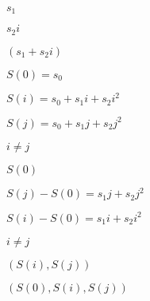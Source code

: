 \documentclass[10pt]{book}
\begin{document}
\begin{mdSnippets}
\begin{mdInlineSnippet}[54dbe5ef61d2f9977c7be03737833609]%
$s_1$\end{mdInlineSnippet}%
\begin{mdInlineSnippet}[ca54723822a18ec052b551ba324cf8a3]%
$s_2i$\end{mdInlineSnippet}%
\begin{mdInlineSnippet}[a60d0a14418f167dfeb76f507c982ff4]%
$(s_1 + s_2 i)$\end{mdInlineSnippet}%
\begin{mdInlineSnippet}[a9175ac52b5153759f2c3680d6dde71d]%
$S(0) = s_0$\end{mdInlineSnippet}%
\begin{mdInlineSnippet}[796480b982a47ec1631c9349ea57f9d9]%
$S(i) = s_0 + s_1 i  + s_2i^2$\end{mdInlineSnippet}%
\begin{mdInlineSnippet}%
$S(j) = s_0 +s_1 j + s_2j^2$\end{mdInlineSnippet}%
\begin{mdInlineSnippet}%
$i \neq j$\end{mdInlineSnippet}%
\begin{mdInlineSnippet}%
$S(0)$\end{mdInlineSnippet}%
\begin{mdInlineSnippet}[4988749526f61dd0008521d8579fbde5]%
$S(j) - S(0) = s_1j + s_2j^2$\end{mdInlineSnippet}%
\begin{mdInlineSnippet}[50776e1692168ef3fc619beb70f44d9e]%
$S(i) - S(0) = s_1i + s_2i^2$\end{mdInlineSnippet}%
\begin{mdInlineSnippet}%
$i \neq j$\end{mdInlineSnippet}%
\begin{mdInlineSnippet}[60385d7ea6b30a99b20a9cdb560f01c1]%
$(S(i), S(j))$\end{mdInlineSnippet}%
\begin{mdInlineSnippet}%
$(S(0),S(i),S(j))$\end{mdInlineSnippet}%

\end{mdSnippets}
\end{document}
